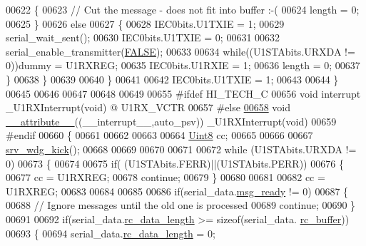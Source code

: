 \begin{DoxyCode}
{{{{{{00622             \{
00623                 \textcolor{comment}{// Cut the message - does not fit into buffer :-(}
00624                 length = 0;
00625             \}
00626             \textcolor{keywordflow}{else}
00627             \{
00628                 IEC0bits.U1TXIE   = 1;
00629                 serial\_wait\_sent();
00630                 IEC0bits.U1TXIE   = 0;
00631 
00632                 serial\_enable\_transmitter(\hyperlink{a00040_aa93f0eb578d23995850d61f7d61c55c1}{FALSE});
00633 
00634                 \textcolor{keywordflow}{while}((U1STAbits.URXDA != 0))dummy = U1RXREG;
00635                 IEC0bits.U1RXIE   = 1;
00636                 length = 0;
00637             \}
00638         \}
00639 
00640     \}
00641 
00642     IEC0bits.U1TXIE   = 1;
00643 
00644 \}
00645 
00646 
00647 
00648 
00649 
00655 \textcolor{preprocessor}{#ifdef HI\_TECH\_C}
00656 \textcolor{keywordtype}{void} interrupt \_U1RXInterrupt(\textcolor{keywordtype}{void}) @ U1RX\_VCTR
00657 \textcolor{preprocessor}{#else}
\hypertarget{a00030_source_l00658}{}\hyperlink{a00030_a2068c3c2584547dbc1c8b9bca2d55b18}{00658} \textcolor{keywordtype}{void} \hyperlink{a00030_a2068c3c2584547dbc1c8b9bca2d55b18}{\_\_attribute\_\_}((\_\_interrupt\_\_,auto\_psv)) \_U1RXInterrupt(\textcolor{keywordtype}{void})
00659 \textcolor{preprocessor}{#endif}
00660 \{
00661      
00662 
00663      
00664     \hyperlink{a00072_af84840501dec18061d18a68c162a8fa2}{Uint8} cc;
00665     
00666     
00667    \hyperlink{a00067_a710d148845397582739d170341f3d3d9}{srv\_wdg\_kick}();
00668    
00669 
00670 
00671    
00672   \textcolor{keywordflow}{while} (U1STAbits.URXDA != 0)
00673     \{
00674         
00675         \textcolor{keywordflow}{if}( (U1STAbits.FERR)||(U1STAbits.PERR))
00676         \{
00677             cc = U1RXREG;
00678             \textcolor{keywordflow}{continue};
00679         \}
00680 
00681      
00682         cc = U1RXREG;
00683     
00684       
00685 
00686         \textcolor{keywordflow}{if}(serial\_data.\hyperlink{a00030_ac0789a6c9ab7ccd13d6f04ae31496854}{msg\_ready} != 0)
00687         \{
00688             \textcolor{comment}{// Ignore messages until the old one is processed}
00689             \textcolor{keywordflow}{continue};
00690         \}
00691 
00692         \textcolor{keywordflow}{if}(serial\_data.\hyperlink{a00030_ab136d4fef2c523afd55b6ca74c46d7cc}{rc\_data\_length} >= \textcolor{keyword}{sizeof}(serial\_data.
      \hyperlink{a00030_ac734cb8be27f86bd99edc539434883a4}{rc\_buffer}))
00693         \{
00694             serial\_data.\hyperlink{a00030_ab136d4fef2c523afd55b6ca74c46d7cc}{rc\_data\_length} = 0;
}}}}}}
\end{DoxyCode}
